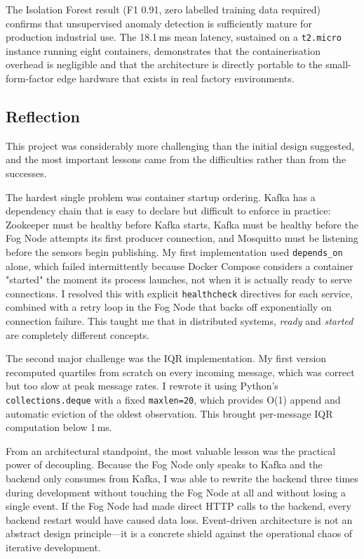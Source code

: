 \documentclass[conference]{IEEEtran}
\begin{document}
The Isolation Forest result (F1 0.91, zero labelled training data required)
confirms that unsupervised anomaly detection is sufficiently mature for
production industrial use. The 18.1\,ms mean latency, sustained on a
\texttt{t2.micro} instance running eight containers, demonstrates that
the containerisation overhead is negligible and that the architecture
is directly portable to the small-form-factor edge hardware that exists
in real factory environments.

\subsection{Reflection}

This project was considerably more challenging than the initial design
suggested, and the most important lessons came from the difficulties rather
than from the successes.

The hardest single problem was container startup ordering. Kafka has a
dependency chain that is easy to declare but difficult to enforce in practice:
Zookeeper must be healthy before Kafka starts, Kafka must be healthy before
the Fog Node attempts its first producer connection, and Mosquitto must be
listening before the sensors begin publishing. My first implementation used
\texttt{depends\_on} alone, which failed intermittently because Docker Compose
considers a container "started" the moment its process launches, not when it
is actually ready to serve connections. I resolved this with explicit
\texttt{healthcheck} directives for each service, combined with a retry loop
in the Fog Node that backs off exponentially on connection failure. This
taught me that in distributed systems, \emph{ready} and \emph{started} are
completely different concepts.

The second major challenge was the IQR implementation. My first version
recomputed quartiles from scratch on every incoming message, which was
correct but too slow at peak message rates. I rewrote it using Python's
\texttt{collections.deque} with a fixed \texttt{maxlen=20}, which provides
O(1) append and automatic eviction of the oldest observation. This brought
per-message IQR computation below 1\,ms.

From an architectural standpoint, the most valuable lesson was the practical
power of decoupling. Because the Fog Node only speaks to Kafka and the backend
only consumes from Kafka, I was able to rewrite the backend three times during
development without touching the Fog Node at all and without losing a single
event. If the Fog Node had made direct HTTP calls to the backend, every
backend restart would have caused data loss. Event-driven architecture is
not an abstract design principle---it is a concrete shield against the
operational chaos of iterative development.
\end{document}
